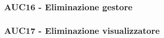 \documentclass[../analisi-dei-requisiti.tex]{subfiles}
\begin{document}


\subsubsection{AUC16 - Eliminazione gestore}%
\label{subsub:AUC16}



\subsubsection{AUC17 - Eliminazione visualizzatore}%
\label{subsub:AUC17}


\end{document}
